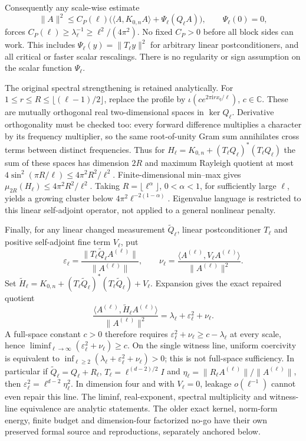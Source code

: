 \documentclass[11pt]{article}
\newcommand{\C}{\mathbb C}
\newcommand{\ip}[2]{\langle #1,#2\rangle}
\begin{document}
Consequently any scale-wise estimate
\[
 \|A\|^2\leq C_P(\ell)\bigl(\ip{A}{K_{0,n}A}+\Psi_\ell(Q_\ell A)\bigr),
 \qquad \Psi_\ell(0)=0,
\]
forces $C_P(\ell)\geq\lambda_\ell^{-1}\geq\ell^2/(4\pi^2)$.
No fixed $C_P>0$ before all block sides can work. This includes
$\Psi_\ell(y)=\|T_\ell y\|^2$ for arbitrary linear postconditioners, and
all critical or faster scalar rescalings. There is no regularity or sign
assumption on the scalar function $\Psi_\ell$.

The original spectral strengthening is retained analytically. For
$1\leq r\leq R\leq\lfloor(\ell-1)/2\rfloor$, replace the profile by
$\iota(c e^{2\pi\mathrm i r x_q/\ell})$, $c\in\C$. These are mutually
orthogonal real two-dimensional spaces in $\ker Q_\ell$. Derivative
orthogonality must be checked too: every forward difference multiplies a
character by its frequency multiplier, so the same root-of-unity Gram sum
annihilates cross terms between distinct frequencies. Thus for
$H_\ell=K_{0,n}+(T_\ell Q_\ell)^*(T_\ell Q_\ell)$ the sum of these spaces
has dimension $2R$ and maximum Rayleigh quotient at most
$4\sin^2(\pi R/\ell)\leq4\pi^2R^2/\ell^2$. Finite-dimensional min--max
gives $\mu_{2R}(H_\ell)\leq4\pi^2R^2/\ell^2$. Taking
$R=\lfloor\ell^\alpha\rfloor$, $0<\alpha<1$, for sufficiently large
$\ell$, yields a growing cluster below $4\pi^2\ell^{-2(1-\alpha)}$.
Eigenvalue language is restricted to this linear self-adjoint operator,
not applied to a general nonlinear penalty.

Finally, for any linear changed measurement $\widetilde Q_\ell$, linear
postconditioner $T_\ell$ and positive self-adjoint fine term $V_\ell$, put
\[
 \varepsilon_\ell=\frac{\|T_\ell\widetilde Q_\ell A^{(\ell)}\|}
                         {\|A^{(\ell)}\|},\qquad
 \nu_\ell=\frac{\ip{A^{(\ell)}}{V_\ell A^{(\ell)}}}
                    {\|A^{(\ell)}\|^2}.
\]
Set $\widetilde H_\ell=K_{0,n}+
(T_\ell\widetilde Q_\ell)^*(T_\ell\widetilde Q_\ell)+V_\ell$.
Expansion gives the exact repaired quotient
\[
 \frac{\ip{A^{(\ell)}}{\widetilde H_\ell A^{(\ell)}}}
      {\|A^{(\ell)}\|^2}
 =\lambda_\ell+\varepsilon_\ell^2+\nu_\ell.
\]
A full-space constant $c>0$ therefore requires
$\varepsilon_\ell^2+\nu_\ell\geq c-\lambda_\ell$ at every scale, hence
$\liminf_{\ell\to\infty}(\varepsilon_\ell^2+\nu_\ell)\geq c$.
On the single witness line, uniform coercivity is equivalent to
$\inf_{\ell\geq2}(\lambda_\ell+\varepsilon_\ell^2+\nu_\ell)>0$;
this is not full-space sufficiency. In particular if
$\widetilde Q_\ell=Q_\ell+R_\ell$, $T_\ell=\ell^{(d-2)/2}I$ and
$\eta_\ell=\|R_\ell A^{(\ell)}\|/\|A^{(\ell)}\|$, then
$\varepsilon_\ell^2=\ell^{d-2}\eta_\ell^2$. In dimension four and with
$V_\ell=0$, leakage $o(\ell^{-1})$ cannot even repair this line.
The liminf, real-exponent, spectral multiplicity and witness-line equivalence
are analytic statements. The older exact kernel, norm-form energy, finite
budget and dimension-four factorized no-go have their own preserved formal
source and reproductions, separately anchored below.
\end{document}
